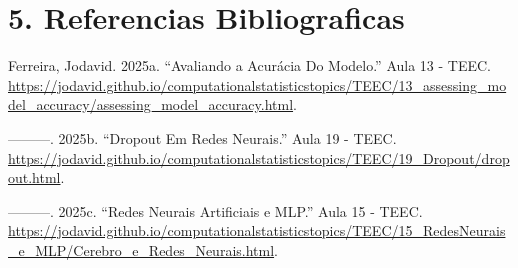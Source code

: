 \documentclass[
  oneclumn]{article}
\newlength{\cslhangindent}
\newenvironment{CSLReferences}[2] %
 {\begin{list}{}{%
  \setlength{\itemindent}{0pt}
  \setlength{\leftmargin}{0pt}
  \setlength{\parsep}{0pt}
  \ifodd #1
   \setlength{\leftmargin}{\cslhangindent}
   \setlength{\itemindent}{-1\cslhangindent}
  \fi
  \setlength{\itemsep}{#2\baselineskip}}}
 {\end{list}}
\begin{document}
\section{5. Referencias
Bibliograficas}\label{referencias-bibliograficas}

\label{refs}
\begin{CSLReferences}{1}{0}
Ferreira, Jodavid. 2025a. {``Avaliando a Acurácia Do Modelo.''} Aula 13
- TEEC.
\url{https://jodavid.github.io/computationalstatisticstopics/TEEC/13_assessing_model_accuracy/assessing_model_accuracy.html}.

---------. 2025b. {``Dropout Em Redes Neurais.''} Aula 19 - TEEC.
\url{https://jodavid.github.io/computationalstatisticstopics/TEEC/19_Dropout/dropout.html}.

---------. 2025c. {``Redes Neurais Artificiais e MLP.''} Aula 15 - TEEC.
\url{https://jodavid.github.io/computationalstatisticstopics/TEEC/15_RedesNeurais_e_MLP/Cerebro_e_Redes_Neurais.html}.

\end{CSLReferences}
\end{document}
